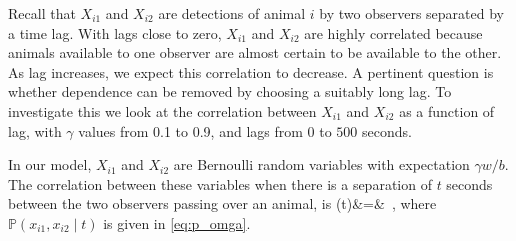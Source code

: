 \documentclass[useAMS, usenatbib, referee]{biom}\usepackage[]{graphicx}\usepackage[]{color}
\begin{document}



Recall that $X_{i1}$ and $X_{i2}$ are detections of animal $i$ by two observers separated by a time lag. With lags close to zero, $X_{i1}$ and $X_{i2}$ are highly correlated because animals available to one observer are almost certain to be available to the other. As lag increases, we expect this correlation to decrease. A pertinent question is whether dependence can be removed by choosing a suitably long lag. To investigate this we look at the correlation between $X_{i1}$ and $X_{i2}$ as a function of lag, with $\gamma$ values from 0.1 to 0.9, and lags from 0 to $500$ seconds.

In our model, $X_{i1}$ and $X_{i2}$ are Bernoulli random variables with expectation $\gamma w/b$. The correlation between these variables when there is a separation of $t$ seconds between the two observers passing over an animal, is
\be
\rho(t)&=&
\,,
\ee
\noindent
where $\mathbb{P}(x_{i1}, x_{i2} \mid t)$ is given in \eqref{eq:p_omga}.
\end{document}
